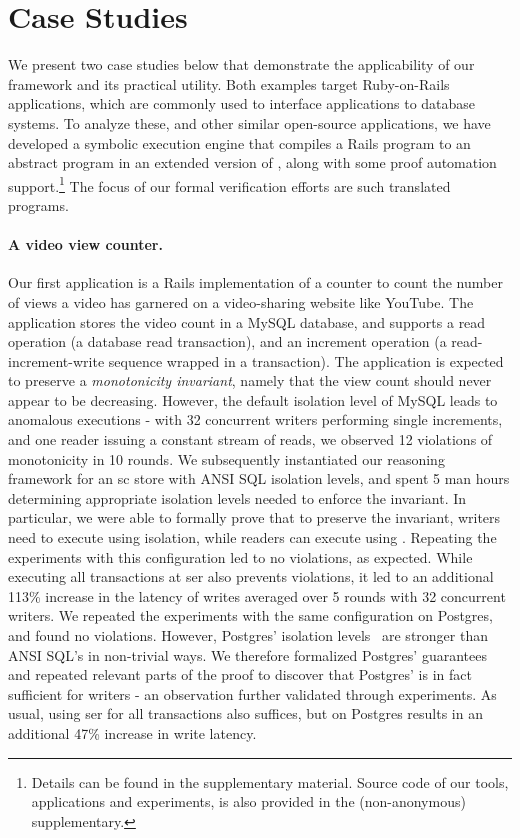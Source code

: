 \section{Case Studies}
\label{sec:case-studies}

We present two case studies below that demonstrate the applicability
of our framework and its practical utility. Both examples
target Ruby-on-Rails applications, which are commonly used to
interface applications to database systems. To analyze these, and
other similar open-source applications, we have developed a symbolic
execution engine that compiles a Rails program to an abstract program
in an extended version of \txnimp, along with some proof automation
support.\footnote{Details can be found in the supplementary material.
Source code of our tools, applications and experiments, is also
provided in the (non-anonymous) supplementary.} The focus of our
formal verification efforts are such translated \txnimp programs.

\paragraph{A video view counter.} Our first application is a Rails
implementation of a counter to count the number of views a video has
garnered on a video-sharing website like YouTube. The application
stores the video count in a MySQL database, and supports a read
operation (a database read transaction), and an increment operation (a
read-increment-write sequence wrapped in a transaction).  The
application is expected to preserve a \emph{monotonicity invariant},
namely that the view count should never appear to be decreasing.
However, the default  isolation level of MySQL
leads to anomalous executions - with 32 concurrent writers performing
single increments, and one reader issuing a constant stream of reads,
we observed 12 violations of monotonicity in 10 rounds. We
subsequently instantiated our reasoning framework for an {\sc sc}
store with ANSI SQL isolation levels, and spent 5 man hours
determining appropriate isolation levels needed to enforce the
invariant. In particular, we were able to formally prove that to
preserve the invariant, writers need to execute using
 isolation, while readers can execute using
. Repeating the experiments with this
configuration led to no violations, as expected. While executing all
transactions at {\sc ser} also prevents violations, it led to an
additional 113\% increase in the latency of writes averaged over 5
rounds with 32 concurrent writers.  We repeated the experiments with
the same configuration on Postgres, and found no violations. However,
Postgres' isolation levels~\cite{postgresiso} are stronger than ANSI
SQL's in non-trivial ways. We therefore formalized Postgres'
guarantees and repeated relevant parts of the proof to discover that
Postgres'  is in fact sufficient for writers - an
observation further validated through experiments. As usual, using
{\sc ser} for all transactions also suffices, but on Postgres results
in an additional 47\% increase in write latency.

